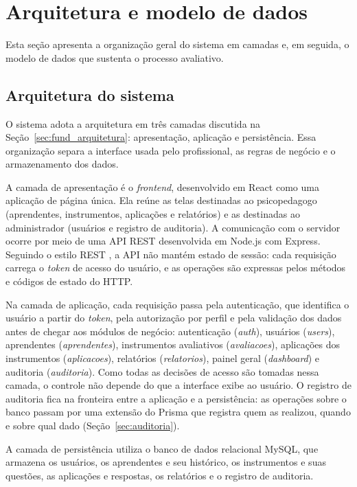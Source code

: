 \section{Arquitetura e modelo de dados}\label{sec:arquitetura_dados}

Esta seção apresenta a organização geral do sistema em camadas e, em seguida, o modelo de dados que sustenta o processo avaliativo.

\subsection{Arquitetura do sistema}\label{sec:arquitetura}

O sistema adota a arquitetura em três camadas discutida na Seção~\ref{sec:fund_arquitetura}: apresentação, aplicação e persistência. Essa organização separa a interface usada pelo profissional, as regras de negócio e o armazenamento dos dados.

A camada de apresentação é o \textit{frontend}, desenvolvido em React como uma aplicação de página única. Ela reúne as telas destinadas ao psicopedagogo (aprendentes, instrumentos, aplicações e relatórios) e as destinadas ao administrador (usuários e registro de auditoria). A comunicação com o servidor ocorre por meio de uma API REST desenvolvida em Node.js com Express. Seguindo o estilo REST \cite{fielding2000_rest}, a API não mantém estado de sessão: cada requisição carrega o \textit{token} de acesso do usuário, e as operações são expressas pelos métodos e códigos de estado do HTTP.

Na camada de aplicação, cada requisição passa pela autenticação, que identifica o usuário a partir do \textit{token}, pela autorização por perfil e pela validação dos dados antes de chegar aos módulos de negócio: autenticação (\textit{auth}), usuários (\textit{users}), aprendentes (\textit{aprendentes}), instrumentos avaliativos (\textit{avaliacoes}), aplicações dos instrumentos (\textit{aplicacoes}), relatórios (\textit{relatorios}), painel geral (\textit{dashboard}) e auditoria (\textit{auditoria}). Como todas as decisões de acesso são tomadas nessa camada, o controle não depende do que a interface exibe ao usuário. O registro de auditoria fica na fronteira entre a aplicação e a persistência: as operações sobre o banco passam por uma extensão do Prisma que registra quem as realizou, quando e sobre qual dado (Seção~\ref{sec:auditoria}).

A camada de persistência utiliza o banco de dados relacional MySQL, que armazena os usuários, os aprendentes e seu histórico, os instrumentos e suas questões, as aplicações e respostas, os relatórios e o registro de auditoria.

